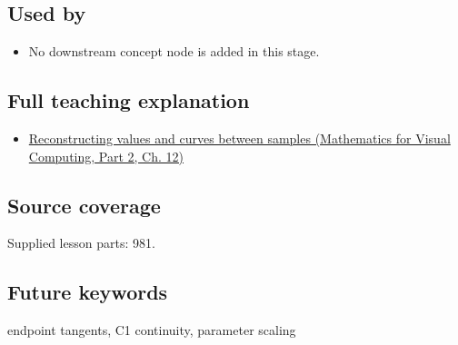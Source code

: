 \subsection{Used by}\label{appendix-db3aef8f2fd6-used-by}

\hypertarget{appendix-db3aef8f2fd6-used-by}{}

\begin{itemize}
\tightlist
\item
  No downstream concept node is added in this stage.
\end{itemize}

\subsection{Full teaching explanation}\label{appendix-db3aef8f2fd6-full-teaching-explanation}

\hypertarget{appendix-db3aef8f2fd6-full-teaching-explanation}{}

\begin{itemize}
\tightlist
\item
  \href{../02-Mathematics-for-Visual-Computing-P02/main.pdf\#nameddest=02-foundations-ii-ch028-reconstructing-values-and-curves-between-samples}{Reconstructing values and curves between samples (Mathematics for Visual Computing, Part 2, Ch. 12)}
\end{itemize}

\subsection{Source coverage}\label{appendix-db3aef8f2fd6-source-coverage}

\hypertarget{appendix-db3aef8f2fd6-source-coverage}{}

Supplied lesson parts: 981.

\subsection{Future keywords}\label{appendix-db3aef8f2fd6-future-keywords}

\hypertarget{appendix-db3aef8f2fd6-future-keywords}{}

endpoint tangents, C1 continuity, parameter scaling
